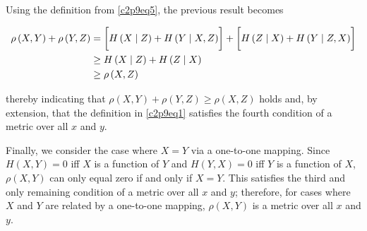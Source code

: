 \documentclass[ClusteringConnectionsMAIN.tex]{subfiles}
\begin{document}
Using the definition from \ref{c2p9eq5}, the previous result becomes

\begin{align} 
\rho \left( X, Y \right) + \rho \left( Y, Z \right) &= \biggl[ H \left( X \mid Z \right) + H \left( Y \mid X, Z \right) \biggr] + \biggl[ H \left( Z \mid X \right) + H \left( Y \mid Z, X \right) \biggr] \notag \\
&\geq H \left( X \mid Z \right) + H \left( Z\mid X \right) \notag \\
&\geq \rho \left( X, Z \right)  \notag
\end{align}

thereby indicating that $\rho \left( X, Y \right) + \rho \left( Y, Z \right) \geq \rho \left( X, Z \right)$ holds and, by extension, that the definition in \ref{c2p9eq1} satisfies the fourth condition of a metric over all $x$ and $y$. \newline


Finally, we consider the case where $X = Y$ via a one-to-one mapping.  Since $H \left( X, Y \right) = 0$ iff $X$ is a function of $Y$ and $H \left( Y, X \right) = 0$ iff $Y$ is a function of $X$, $\rho \left( X, Y \right)$ can only equal zero if and only if $X = Y$.  This satisfies the third and only remaining condition of a metric over all $x$ and $y$; therefore, for cases where $X$ and $Y$ are related by a one-to-one mapping, $\rho \left( X, Y \right)$ is a metric over all $x$ and $y$.
\end{document}

